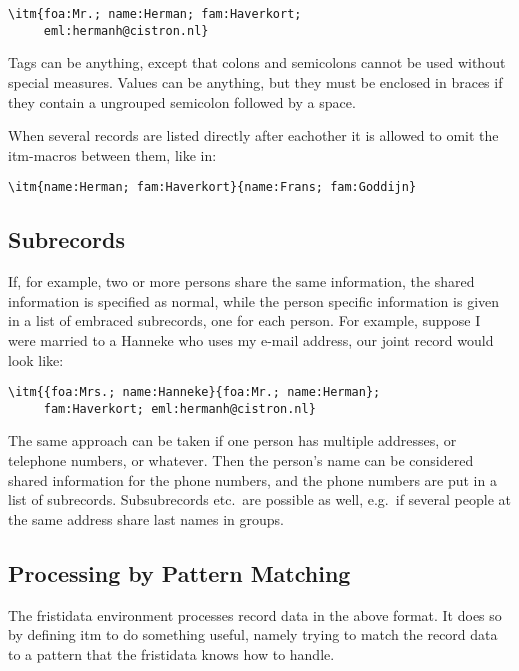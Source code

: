 \documentclass[11pt]{article}
\makeatletter
\def\macroname#1{{\ttfamily\@ttbs#1}}  %
\def\envirname#1{{\ttfamily #1}}       %
\def\<#1>{\macroname{#1}}
\makeatother
\begin{document}
\begin{verbatim}
\itm{foa:Mr.; name:Herman; fam:Haverkort;
     eml:hermanh@cistron.nl}
\end{verbatim}

Tags can be anything, except that colons and semicolons cannot be used
without special measures. Values can be anything, but they must
be enclosed in braces if they contain a ungrouped semicolon followed
by a space.

When several records are listed directly after eachother it is
allowed to omit the \<itm>-macros between them, like in:

\begin{verbatim}
\itm{name:Herman; fam:Haverkort}{name:Frans; fam:Goddijn}
\end{verbatim}

\subsection{Subrecords}

If, for example, two or more persons share the same information,
the shared information is specified as normal, while the person
specific information is given in a list of embraced subrecords, one
for each person. For example, suppose I were married to a Hanneke
who uses my e-mail address, our joint record would look like:

\begin{verbatim}
\itm{{foa:Mrs.; name:Hanneke}{foa:Mr.; name:Herman};
     fam:Haverkort; eml:hermanh@cistron.nl}
\end{verbatim}

The same approach can be taken if one person has multiple addresses,
or telephone numbers, or whatever. Then the person's name can be
considered shared information for the phone numbers, and the
phone numbers are put in a list of subrecords. Subsubrecords
etc.\ are possible as well, e.g.\ if several people at the same
address share last names in groups.

\subsection{Processing by Pattern Matching}

The \envirname{fristidata} environment processes record data in
the above format. It does so by defining \<itm> to do something
useful, namely trying to match the record data to a pattern
that the \envirname{fristidata} knows how to handle.
\end{document}
